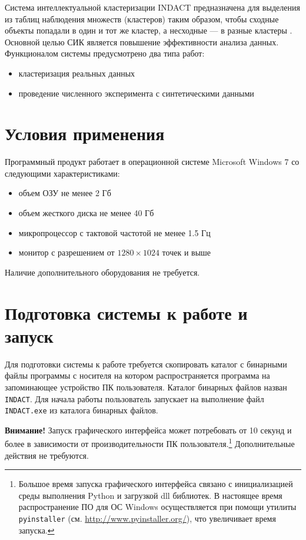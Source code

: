 \documentclass[12pt,twoside,a4paper,tikz,border=5]{refart}
\begin{document}
Система интеллектуальной кластеризации INDACT предназначена для выделения из таблиц наблюдения множеств (кластеров) таким образом, чтобы сходные объекты попадали в один и тот же кластер, а несходные — в разные кластеры \cite{data-science}. Основной целью СИК является повышение эффективности анализа данных. Функционалом системы предусмотрено два типа работ:
\begin{itemize}
	\item кластеризация реальных данных
	\item проведение численного эксперимента с синтетическими данными
\end{itemize}

\section{Условия применения}

Программный продукт работает в операционной системе Microsoft Windows 7 со следующими характеристиками:
\begin{itemize}
	\item объем ОЗУ не менее 2 Гб
	\item объем жесткого диска не менее 40 Гб
	\item микропроцессор с тактовой частотой не менее 1.5 Гц
	\item монитор с разрешением от $1280 \times 1024$ точек и выше
\end{itemize}
	Наличие дополнительного оборудования не требуется. 
	
\section{Подготовка системы к работе и запуск}
Для подготовки системы к работе требуется скопировать каталог с бинарными файлы программы с носителя на котором распространяется программа на запоминающее устройство ПК пользователя.  Каталог бинарных файлов назван \texttt{INDACT}. Для начала работы пользователь запускает на выполнение файл \texttt{INDACT.exe} из каталога бинарных файлов. 

\textbf{Внимание!} Запуск графического интерфейса может  потребовать от 10 секунд и более в зависимости от производительности ПК пользователя.\footnote{Большое время запуска графического интерфейса связано с инициализацией среды выполнения Python и загрузкой dll библиотек. В настоящее время распространение ПО для ОС Windows осуществляется при помощи утилиты \texttt{pyinstaller} (см. \url{http://www.pyinstaller.org/}), что увеличивает время запуска.} Дополнительные действия не требуются.
\end{document}
